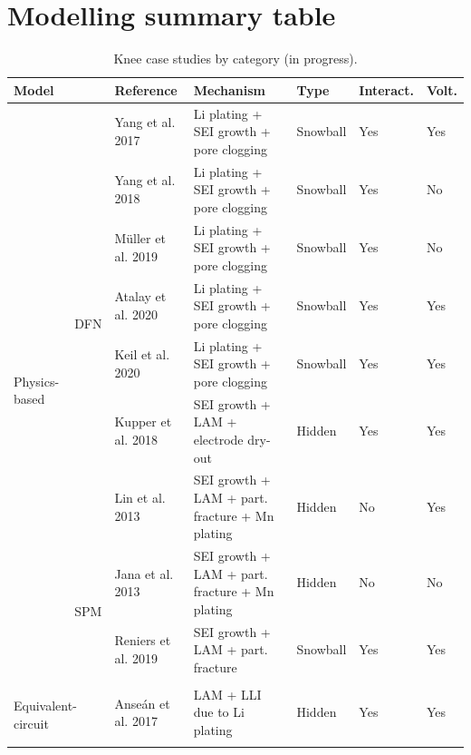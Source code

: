 \documentclass[journal=jpclcd,manuscript=article]{achemso}
\begin{document}
\section{Modelling summary table}

\begin{landscape}

\begin{table}
    \caption{Knee case studies by category (in progress).}
    \label{table:expt_summary}
    \centering
    \small
    \begin{tabular}{|l|l|l|l|l|l|l|}
    \hline
        \multicolumn{2}{|l|}{\textbf{Model}} & \textbf{Reference} & \textbf{Mechanism} & \textbf{Type} & \textbf{Interact.} & \textbf{Volt.} \\ \hline
        \multirow{9}{*}{Physics-based} & \multirow{7}{*}{DFN} & Yang et al. 2017 \cite{yang_modeling_2017} & Li plating + SEI growth + pore clogging & Snowball & Yes & Yes \\ \cline{3-7}
         & & Yang et al. 2018 \cite{yang_understanding_2018} & Li plating + SEI growth + pore clogging & Snowball & Yes & No \\ \cline{3-7}
         & & Müller et al. 2019 \cite{muller_model-based_2019} & Li plating + SEI growth + pore clogging & Snowball & Yes & No \\ \cline{3-7}
         & & Atalay et al. 2020 \cite{atalay_theory_2020} & Li plating + SEI growth + pore clogging & Snowball & Yes & Yes \\ \cline{3-7}
         & & Keil et al. 2020 \cite{keil_electrochemical_2020} & Li plating + SEI growth + pore clogging & Snowball & Yes & Yes \\ \cline{3-7}
         & & Kupper et al. 2018 \cite{kupper_end--life_2018} & SEI growth + LAM + electrode dry-out & Hidden & Yes & Yes \\ \cline{3-7}
         & & Lin et al. 2013 \cite{lin_comprehensive_2013} & SEI growth + LAM + part. fracture + Mn plating & Hidden & No & Yes \\ \cline{2-7}
         & \multirow{2}{*}{SPM} & Jana et al. 2013 \cite{jana_physical_2019} & SEI growth + LAM + part. fracture + Mn plating & Hidden & No & No \\ \cline{3-7}
         & & Reniers et al. 2019 \cite{reniers_review_2019} & SEI growth + LAM + part. fracture & Snowball & Yes & Yes \\ \hline
        \multicolumn{7}{c}{}  \\ \hline
        \multicolumn{2}{|l|}{\multirow{2}{*}{Equivalent-circuit}} & Anseán et al. 2017 \cite{ansean_operando_2017} & LAM + LLI due to Li plating & Hidden & Yes & Yes \\ \cline{3-7}

\end{tabular}
\end{table}
\end{landscape}
\end{document}
